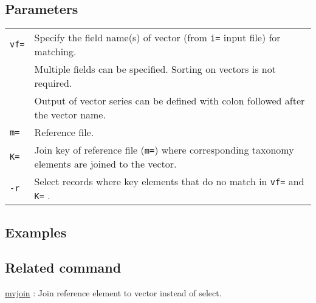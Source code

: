 \subsection*{Parameters}
\begin{table}[htbp]
{\small
\begin{tabular}{ll}

\verb|vf=| & Specify the field name(s) of vector (from \verb|i=| input file) for matching. \\
           & Multiple fields can be specified. Sorting on vectors is not required. \\
           & Output of vector series can be defined with colon followed after the vector name. \\
\verb|m=|  & Reference file. \\
\verb|K=|  &  Join key of reference file (\verb|m=|) where corresponding taxonomy elements are joined to the vector. \\
\verb|-r|  & Select records where key elements that do no match in \verb|vf=| and \verb|K=| .   \\
\end{tabular}
}
\end{table} 


\subsection*{Examples}


\subsection*{Related command}
\hyperref[sect:mvjoin]{mvjoin} : Join reference element to vector instead of select. 

%
